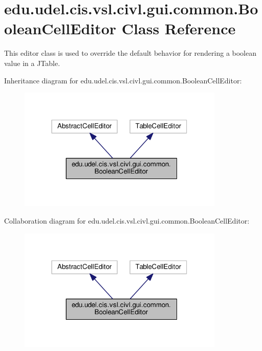 \hypertarget{classedu_1_1udel_1_1cis_1_1vsl_1_1civl_1_1gui_1_1common_1_1BooleanCellEditor}{}\section{edu.\+udel.\+cis.\+vsl.\+civl.\+gui.\+common.\+Boolean\+Cell\+Editor Class Reference}
\label{classedu_1_1udel_1_1cis_1_1vsl_1_1civl_1_1gui_1_1common_1_1BooleanCellEditor}


This editor class is used to override the default behavior for rendering a boolean value in a J\+Table.  




Inheritance diagram for edu.\+udel.\+cis.\+vsl.\+civl.\+gui.\+common.\+Boolean\+Cell\+Editor\+:
\nopagebreak
\begin{figure}[H]
\begin{center}
\leavevmode
\includegraphics[width=278pt]{classedu_1_1udel_1_1cis_1_1vsl_1_1civl_1_1gui_1_1common_1_1BooleanCellEditor__inherit__graph}
\end{center}
\end{figure}


Collaboration diagram for edu.\+udel.\+cis.\+vsl.\+civl.\+gui.\+common.\+Boolean\+Cell\+Editor\+:
\nopagebreak
\begin{figure}[H]
\begin{center}
\leavevmode
\includegraphics[width=278pt]{classedu_1_1udel_1_1cis_1_1vsl_1_1civl_1_1gui_1_1common_1_1BooleanCellEditor__coll__graph}
\end{center}
\end{figure}
